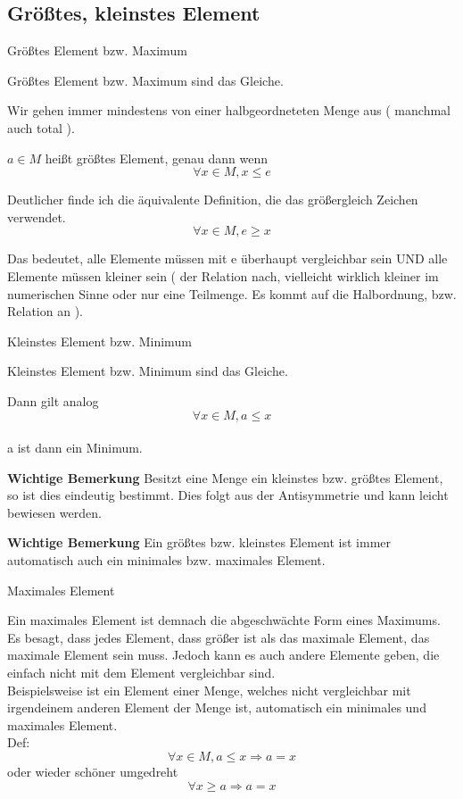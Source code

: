 \documentclass[smallheadings,headsepline,12pt,a4paper]{scrartcl}
\begin{document}
\subsection*{Größtes, kleinstes Element}

\begin{center}
\item[Größtes Element bzw. Maximum]
\end{center}
\item Größtes Element bzw. Maximum sind das Gleiche.
\item Wir gehen immer mindestens von einer halbgeordneteten Menge aus ( manchmal auch total ).
\item $ a\in M$ heißt größtes Element, genau dann wenn $$ \forall x \in M , x \leq e $$
\item Deutlicher finde ich die äquivalente Definition, die das größergleich Zeichen verwendet.
$$ \forall x \in M, e \geq x $$
\item Das bedeutet, alle Elemente müssen mit e überhaupt vergleichbar sein UND alle Elemente müssen kleiner sein ( der Relation nach, vielleicht wirklich kleiner im numerischen Sinne oder nur eine Teilmenge. Es kommt auf die Halbordnung, bzw. Relation an ).


\newpage

\begin{center}
\item[Kleinstes Element bzw. Minimum]
\end{center}
\item Kleinstes Element bzw. Minimum sind das Gleiche.
\item Dann gilt analog $$ \forall x \in M, a \leq x $$ \\
 a ist dann ein Minimum.
\item \textbf{Wichtige Bemerkung} Besitzt eine Menge ein kleinstes bzw. größtes Element, so ist dies eindeutig bestimmt. Dies folgt aus der Antisymmetrie und kann leicht bewiesen werden.
\item \textbf{Wichtige Bemerkung} Ein größtes bzw. kleinstes Element ist immer automatisch auch ein minimales bzw. maximales Element.

\newpage

\begin{center}
\item[Maximales Element]
\end{center}
\item Ein maximales Element ist demnach die abgeschwächte Form eines Maximums. Es besagt, dass jedes Element, dass größer ist als das maximale Element, das maximale Element sein muss. Jedoch kann es auch andere Elemente geben, die einfach nicht mit dem Element vergleichbar sind. \\
Beispielsweise ist ein Element einer Menge, welches nicht vergleichbar mit irgendeinem anderen Element der Menge ist, automatisch ein minimales und maximales Element. \\
 Def: $$ \forall x \in M , a \leq x \Rightarrow a = x $$
 oder wieder schöner umgedreht $$ \forall x \geq a \Rightarrow a = x $$
\end{document}
